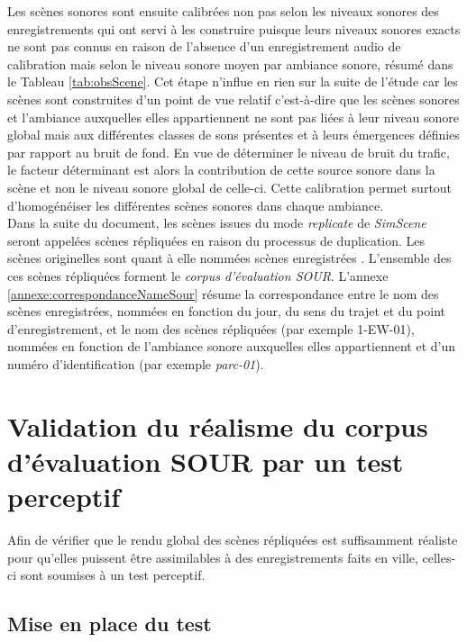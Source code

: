 Les scènes sonores sont ensuite calibrées non pas selon les niveaux sonores des enregistrements qui ont servi à les construire puisque leurs niveaux sonores exacts ne sont pas connus en raison de l'absence d'un enregistrement audio de calibration mais selon le niveau sonore moyen par ambiance sonore, résumé dans le Tableau \ref{tab:obsScene}. 
Cet étape n'influe en rien sur la suite de l'étude car les scènes sont construites d'un point de vue relatif c'est-à-dire que les scènes sonores et l'ambiance auxquelles elles appartiennent ne sont pas liées à leur niveau sonore global mais aux différentes classes de sons présentes et à leurs émergences définies par rapport au bruit de fond. En vue de déterminer le niveau de bruit du trafic, le facteur déterminant est alors la contribution de cette source sonore dans la scène et non le niveau sonore global de celle-ci. Cette calibration permet surtout d'homogénéiser les différentes scènes sonores dans chaque ambiance.\\

Dans la suite du document, les scènes issues du mode \textit{replicate} de \textit{SimScene} seront appelées \og scènes répliquées \fg{} en raison du processus de duplication. Les scènes originelles sont quant à elle nommées \og scènes enregistrées \fg{}. L'ensemble des ces scènes répliquées forment le \textit{corpus d'évaluation SOUR}. L'annexe \ref{annexe:correspondanceNameSour} résume la correspondance entre le nom des scènes enregistrées, nommées en fonction du jour, du sens du trajet et du point d'enregistrement, et le nom des scènes répliquées (par exemple 1-EW-01), nommées en fonction de l'ambiance sonore auxquelles elles appartiennent et d'un numéro d'identification (par exemple \textit{parc-01}). \\


\section{Validation du réalisme du corpus d'évaluation SOUR par un test perceptif}\label{sec:test}

Afin de vérifier que le rendu global des scènes répliquées est suffisamment réaliste pour qu'elles puissent être assimilables à des enregistrements faits en ville, celles-ci sont soumises à un test perceptif.

\subsection{Mise en place du test}

